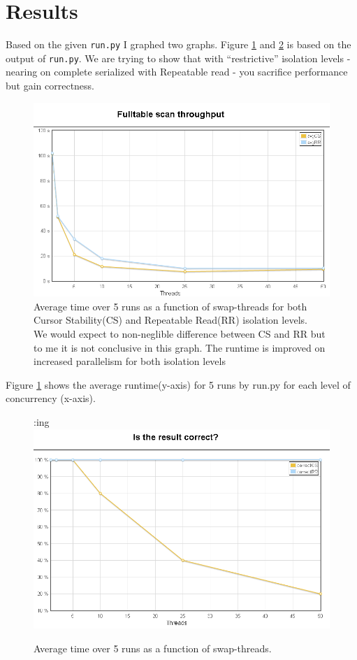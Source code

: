 \section{Results}
Based on the given \verb|run.py| I graphed two graphs. Figure
\ref{fig:origtime} and \ref{fig:origcorrect} is based on the output of
\verb|run.py|. We are trying to show that with ``restrictive'' isolation levels
- nearing on complete serialized with Repeatable read - you sacrifice
performance but gain correctness.
\begin{figure}
  \centering
  \includegraphics[width=12cm]{assignment1/origtime}
  \caption[Average time over 5 runs]{Average time over 5 runs as a function of
  swap-threads for both Cursor Stability(CS) and Repeatable Read(RR) isolation levels.\\
  We would expect to non-neglible difference between CS and RR but to me it is
  not conclusive in this graph. The runtime is improved on increased parallelism
  for both isolation levels}\label{fig:origtime}
\end{figure}

Figure \ref{fig:origtime} shows the average runtime(y-axis) for 5 runs by run.py for
each level of concurrency (x-axis).

\begin{figure}
  \center:ing
  \includegraphics[width=12cm]{assignment1/origcorrect}
  \caption{Average time over 5 runs as a function of swap-threads.}\label{fig:origcorrect}
\end{figure}

